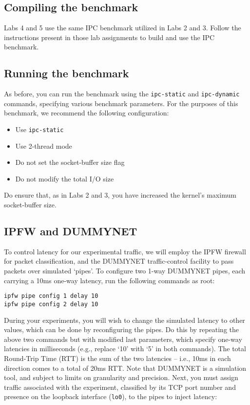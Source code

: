 \documentclass[a4paper,10pt]{article}
\begin{document}
\subsection*{Compiling the benchmark}

Labs 4 and 5 use the same IPC benchmark utilized in Labs 2 and 3.
Follow the instructions present in those lab assignments to build and use the
IPC benchmark.

\subsection*{Running the benchmark}

As before, you can run the benchmark using the \texttt{ipc-static} and
\texttt{ipc-dynamic} commands, specifying various benchmark parameters.
For the purposes of this benchmark, we recommend the following configuration:

\begin{itemize}
\item Use \texttt{ipc-static}
\item Use 2-thread mode
\item Do not set the socket-buffer size flag
\item Do not modify the total I/O size
\end{itemize}

\noindent
Do ensure that, as in Labs 2 and 3, you have increased the kernel's maximum 
socket-buffer size.

\subsection*{IPFW and DUMMYNET}

To control latency for our experimental traffic, we will employ the IPFW
firewall for packet classification, and the DUMMYNET traffic-control facility
to pass packets over simulated `pipes'.
To configure two 1-way DUMMYNET pipes, each carrying a 10ms one-way latency,
run the following commands as root:

\begin{verbatim}
ipfw pipe config 1 delay 10
ipfw pipe config 2 delay 10
\end{verbatim}

\noindent
During your experiments, you will wish to change the simulated latency to
other values, which can be done by reconfiguring the pipes.
Do this by repeating the above two commands but with modified last parameters,
which specify one-way latencies in milliseconds (e.g., replace `10' with `5'
in both commands).
The total Round-Trip Time (RTT) is the sum of the two latencies -- i.e., 10ms
in each direction comes to a total of 20ms RTT.
Note that DUMMYNET is a simulation tool, and subject to limits on granularity
and precision.
Next, you must assign traffic associated with the experiment, classified by
its TCP port number and presence on the loopback interface (\texttt{lo0}), to
the pipes to inject latency:
\end{document}
